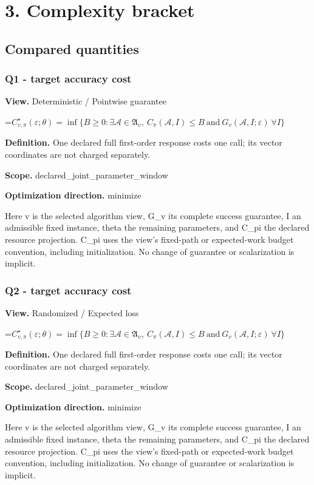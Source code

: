 \documentclass[10pt,a4paper]{article}
\newcommand{\AtlasMath}[1]{\par\begingroup\centering\setbox0=\hbox{$\displaystyle #1$}\ifdim\wd0>1.4\linewidth\typeout{ATLAS WIDE FORMULA: \the\wd0}\fi\ifdim\wd0>\linewidth\resizebox{\linewidth}{!}{\box0}\else\box0\fi\par\endgroup}
\begin{document}
\section{3. Complexity bracket}
\subsection{Compared quantities}
\subsubsection{Q1 - target accuracy cost}
\textbf{View.} Deterministic / Pointwise guarantee

\AtlasMath{C^\star_{v,\pi}(\varepsilon;\theta)=\inf\{B\ge0:\exists\mathcal A\in\mathfrak A_v,\ C_\pi(\mathcal A,I)\le B\ \text{and}\ G_v(\mathcal A,I;\varepsilon)\ \forall I\}}
\textbf{Definition.} One declared full first-order response costs one call; its vector coordinates are not charged separately.

\textbf{Scope.} declared\_joint\_parameter\_window

\textbf{Optimization direction.} minimize

Here v is the selected algorithm view, G\_v its complete success guarantee, I an admissible fixed instance, theta the remaining parameters, and C\_pi the declared resource projection. C\_pi uses the view's fixed-path or expected-work budget convention, including initialization. No change of guarantee or scalarization is implicit.

\subsubsection{Q2 - target accuracy cost}
\textbf{View.} Randomized / Expected loss

\AtlasMath{C^\star_{v,\pi}(\varepsilon;\theta)=\inf\{B\ge0:\exists\mathcal A\in\mathfrak A_v,\ C_\pi(\mathcal A,I)\le B\ \text{and}\ G_v(\mathcal A,I;\varepsilon)\ \forall I\}}
\textbf{Definition.} One declared full first-order response costs one call; its vector coordinates are not charged separately.

\textbf{Scope.} declared\_joint\_parameter\_window

\textbf{Optimization direction.} minimize

Here v is the selected algorithm view, G\_v its complete success guarantee, I an admissible fixed instance, theta the remaining parameters, and C\_pi the declared resource projection. C\_pi uses the view's fixed-path or expected-work budget convention, including initialization. No change of guarantee or scalarization is implicit.
\end{document}
